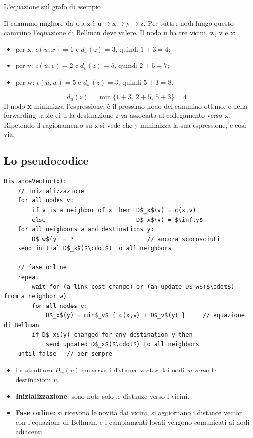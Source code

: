 \begin{esempio}{L'equazione sul grafo di esempio}
\begin{center}
\end{center}
Il cammino migliore da u a z è u$\rightarrow$x$\rightarrow$y$\rightarrow$z. Per tutti i nodi lungo questo cammino l'equazione di
Bellman deve valere. Il nodo u ha tre vicini, w, v e x:
\begin{itemize}
    \item per x: $c(u,x) = 1$ e $d_x(z) = 3$, quindi $1 + 3 = 4$;
    \item per v: $c(u,v) = 2$ e $d_v(z) = 5$, quindi $2 + 5 = 7$;
    \item per w: $c(u,w) = 5$ e $d_w(z) = 3$, quindi $5 + 3 = 8$.
\end{itemize}
$$d_u(z) = \min\{1+3,\ 2+5,\ 5+3\} = 4$$
Il nodo \textbf{x} minimizza l'espressione: è il prossimo nodo del cammino ottimo, e nella forwarding table di u la destinazione z
va associata al collegamento verso x. Ripetendo il ragionamento su x si vede che y minimizza la sua espressione, e così via.
\end{esempio}

\subsection{Lo pseudocodice}

\begin{lstlisting}[mathescape=true, title={Distance Vector, eseguito da ogni nodo $x$}]
DistanceVector(x):
    // inizializzazione
    for all nodes v:
        if v is a neighbor of x then  D$_x$(v) = c(x,v)
        else                          D$_x$(v) = $\infty$
    for all neighbors w and destinations y:
        D$_w$(y) = ?                     // ancora sconosciuti
    send initial D$_x$($\cdot$) to all neighbors

    // fase online
    repeat
        wait for (a link cost change) or (an update D$_w$($\cdot$) from a neighbor w)
        for all nodes y:
            D$_x$(y) = min$_v$ { c(x,v) + D$_v$(y) }     // equazione di Bellman
        if D$_x$(y) changed for any destination y then
            send updated D$_x$($\cdot$) to all neighbors
    until false   // per sempre
\end{lstlisting}

\begin{itemize}
    \item La struttura $D_w(v)$ conserva i distance vector dei nodi $w$ verso le destinazioni $v$.
    \item \textbf{Inizializzazione}: sono note solo le distanze verso i vicini.
    \item \textbf{Fase online}: si ricevono le novità dai vicini, si aggiornano i distance vector con l'equazione di Bellman, e i
          cambiamenti locali vengono comunicati ai nodi adiacenti.
\end{itemize}

